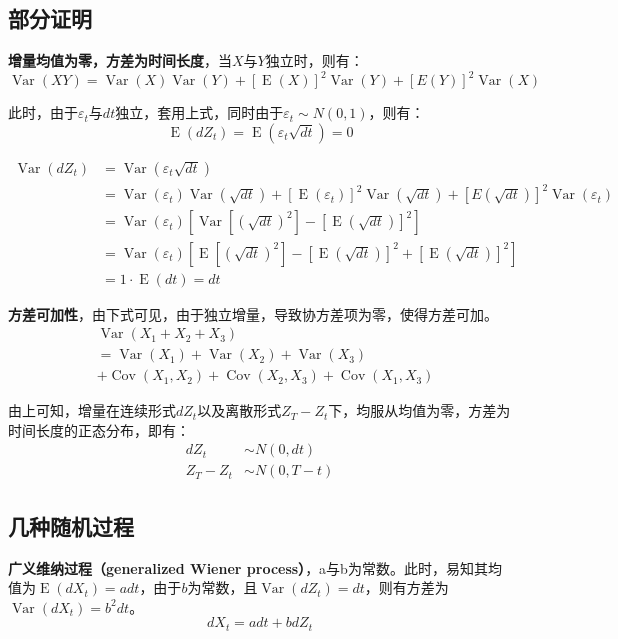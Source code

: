 \documentclass[11pt]{article}
\newcommand{\E}{\operatorname{E}}
\newcommand{\Cov}{\operatorname{Cov}}
\newcommand{\Var}{\operatorname{Var}}
\begin{document}
\subsection{部分证明}

\textbf{增量均值为零，方差为时间长度}，当$X$与$Y$独立时，则有：
\begin{equation*}
    \Var(XY) = \Var(X)\Var(Y) + [\E(X)]^2 \Var(Y) + [E(Y)]^2 \Var(X)
\end{equation*}

此时，由于$\varepsilon_t$与$dt$独立，套用上式，同时由于$\varepsilon_t \sim N(0,1)$，则有：
\begin{equation*}
    \E(dZ_t) = \E(\varepsilon_t \sqrt{dt}) = 0
\end{equation*}

\begin{align*}
    \Var(dZ_t) & = \Var( \varepsilon_t \sqrt{dt}) \\
    & =  \Var(\varepsilon_t) \Var(\sqrt{dt}) + [\E(\varepsilon_t)]^2 \Var(\sqrt{dt}) + [E(\sqrt{dt})]^2 \Var(\varepsilon_t) \\
    & = \Var(\varepsilon_t) \left[ \Var[(\sqrt{dt})^2] - [\E(\sqrt{dt})]^2 \right] \\
    & = \Var(\varepsilon_t) \left[ \E[(\sqrt{dt})^2] - [\E(\sqrt{dt})]^2 + [\E(\sqrt{dt})]^2 \right] \\
    & = 1 \cdot \E(dt) = dt
\end{align*}

\textbf{方差可加性}，由下式可见，由于独立增量，导致协方差项为零，使得方差可加。
\begin{align*}
     & \Var(X_1+X_2+X_3) \\
     & = \Var(X_1) + \Var(X_2) + \Var(X_3) \\
     & + \Cov(X_1,X_2) + \Cov(X_2,X_3) + \Cov(X_1,X_3)
\end{align*}

由上可知，增量在连续形式$dZ_t$以及离散形式$Z_T-Z_t$下，均服从均值为零，方差为时间长度的正态分布，即有：
\begin{align*}
    dZ_t & \sim N(0,dt) \\
    Z_T - Z_t & \sim N(0,T-t)
\end{align*}

\subsection{几种随机过程}

\textbf{广义维纳过程（generalized Wiener process）}，a与b为常数。此时，易知其均值为$\E(dX_t) = adt$，由于$b$为常数，且$\Var(dZ_t)=dt$，则有方差为$\Var(dX_t)=b^2 dt$。
\begin{equation*}
    dX_t =a dt + b dZ_t
\end{equation*}
\end{document}
